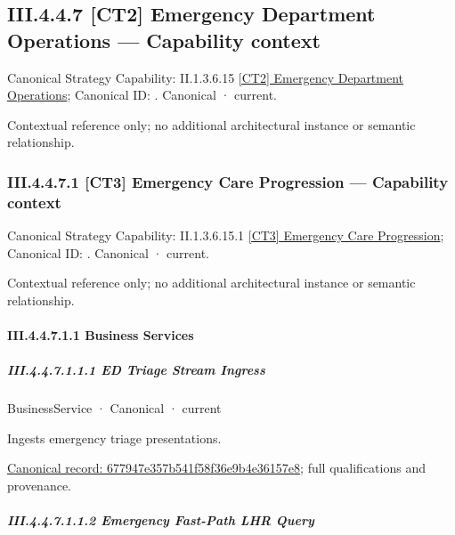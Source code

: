 \subsection*{III.4.4.7 [CT2] Emergency Department Operations — Capability context}
\label{navigation:III.4.4.7}

{\small Canonical Strategy Capability: II.1.3.6.15 \hyperref[element:24a4b5815faa4d369bc756a6e97d3e9e]{[CT2] Emergency Department Operations}; Canonical ID: \texttt{}. Canonical · current.}\par
Contextual reference only; no additional architectural instance or semantic relationship.\par
\subsubsection*{III.4.4.7.1 [CT3] Emergency Care Progression — Capability context}
\label{navigation:III.4.4.7.1}

{\small Canonical Strategy Capability: II.1.3.6.15.1 \hyperref[element:7125e459a48946d0ba075b5ecc3571b4]{[CT3] Emergency Care Progression}; Canonical ID: \texttt{}. Canonical · current.}\par
Contextual reference only; no additional architectural instance or semantic relationship.\par
\paragraph*{III.4.4.7.1.1 Business Services}
\label{navigation:III.4.4.7.1.1}

\subparagraph*{III.4.4.7.1.1.1 ED Triage Stream Ingress}
\label{navigation:III.4.4.7.1.1.1}

\label{element:677947e357b541f58f36e9b4e36157e8}
{\small BusinessService · Canonical · current}\par

Ingests emergency triage presentations.


{\footnotesize \href{../../../../../../../continuum/business/business-service/677947e357b541f58f36e9b4e36157e8.md}{Canonical record: 677947e357b541f58f36e9b4e36157e8}; full qualifications and provenance.}\par
\subparagraph*{III.4.4.7.1.1.2 Emergency Fast-Path LHR Query}
\label{navigation:III.4.4.7.1.1.2}

